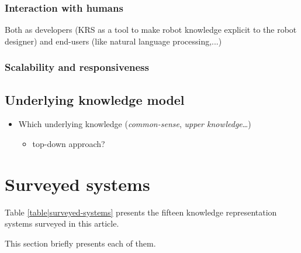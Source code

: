 \documentclass[a4paper, twocolumn]{article}
\begin{document}
\subsubsection{Interaction with humans}
\label{sect|hri}

Both as developers (KRS as a tool to make robot knowledge explicit to the
robot designer) and end-users (like natural language processing,...)

\subsubsection{Scalability and responsiveness}
\label{sect|scalability}


\subsection{Underlying knowledge model}

\begin{itemize}
	\item  Which underlying knowledge (\emph{common-sense}, \emph{upper knowledge}\ldots{})
	\begin{itemize}
		\item  top-down approach?
	\end{itemize}

\end{itemize}



\section{Surveyed systems}

Table \ref{table|surveyed-systems} presents the fifteen knowledge representation systems surveyed
in this article.

This section briefly presents each of them.
\end{document}
